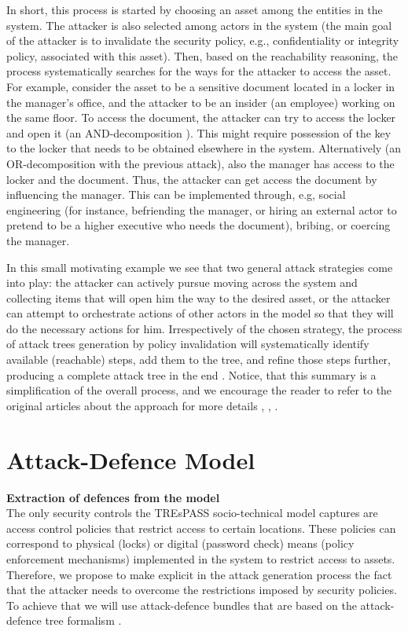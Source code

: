 \documentclass{llncs}
\begin{document}
In short, this process is started by choosing an asset among the entities in the system. The attacker is also selected among actors in the system (the main goal of the attacker is to invalidate the security policy, e.g., confidentiality or integrity policy, associated with this asset). Then, based on the reachability reasoning, the process systematically searches for the ways for the attacker to access the asset. For example, consider the asset to be a sensitive document located in a locker in the manager's office, and the attacker to be an insider (an employee) working on the same floor. To access the document, the attacker can try to access the locker and open it (an AND-decomposition \cite{Kordy-JLC-2014}). This might require possession of the key to the locker that needs to be obtained elsewhere in the system.  Alternatively (an OR-decomposition with the previous attack), also the manager has access to the locker and the document. Thus, the attacker can get access the document by influencing the manager. This can be implemented through, e.g, social engineering (for instance, befriending the manager, or hiring an external actor to pretend to be a higher executive who needs the document), bribing, or coercing the manager.

In this small motivating example we see that two general attack strategies come into play: the attacker can actively pursue moving across the system and collecting items that will open him the way to the desired asset, or the attacker can attempt to orchestrate actions of other actors in the model so that they will do the necessary actions for him. Irrespectively of the chosen strategy, the process of attack trees generation by policy invalidation will systematically identify available (reachable) steps, add them to the tree, and refine those steps further, producing a complete attack tree in the end \cite{Ivanova-Generation-2014}. Notice, that this summary is a simplification of the overall process, and we encourage the reader to refer to the original articles about the approach for more details \cite{Ivanova-Generation-2014}, \cite{D3.4.1-2014}, \cite{Kammuller-2013}.

\section{Attack-Defence Model}\label{sec:extraction}

\textbf{Extraction of defences from the model}\\
The only security controls the TREsPASS socio-technical model captures are access control policies that restrict access to certain locations. These policies can correspond to physical (locks) or digital (password check) means (policy enforcement mechanisms) implemented in the system to restrict access to assets. Therefore, we propose to make explicit in the attack generation process the fact that the attacker needs to overcome the restrictions imposed by security policies. To achieve that we will use attack-defence bundles that are based on the attack-defence tree formalism \cite{Kordy-JLC-2014}. 
\end{document}
